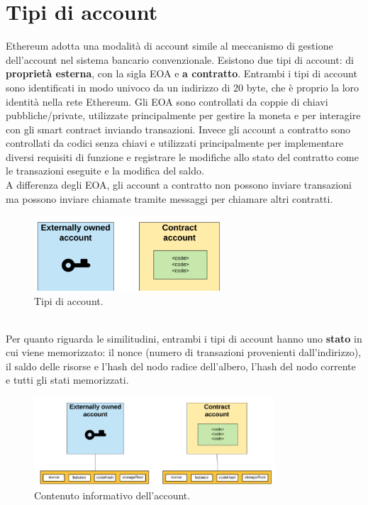 \documentclass[a4paper,11pt]{report}
\begin{document}
\section{Tipi di account}
Ethereum adotta una modalità di account simile al meccanismo di gestione dell'account nel sistema bancario convenzionale. Esistono due tipi di account: di \textbf{proprietà esterna}, con la sigla EOA e \textbf{a contratto}. Entrambi i tipi di account sono identificati in modo univoco da un indirizzo di 20 byte, che è proprio la loro identità nella rete Ethereum. Gli EOA sono controllati da coppie di chiavi pubbliche/private, utilizzate principalmente per gestire la moneta e per interagire con gli smart contract inviando transazioni. Invece gli account a contratto sono controllati da codici senza chiavi e utilizzati principalmente per implementare diversi requisiti di funzione e registrare le modifiche allo stato del contratto come le transazioni eseguite e la modifica del saldo.\\
A differenza degli EOA, gli account a contratto non possono inviare transazioni ma possono inviare chiamate tramite messaggi per chiamare altri contratti.\\
\begin{figure}[htbp] 
\begin{center}
\includegraphics[width=7cm]{img/ac.png} 
\end{center}
\caption{Tipi di account.}
\end{figure}
\\Per quanto riguarda le similitudini, entrambi i tipi di account hanno uno \textbf{stato} in cui viene memorizzato: il nonce (numero di transazioni provenienti dall'indirizzo), il saldo delle risorse e l'hash del nodo radice dell'albero, l'hash del nodo corrente e tutti gli stati memorizzati. \\
\begin{figure}[htbp] 
\begin{center}
\includegraphics[width=9cm]{img/ndi.png} 
\end{center}
\caption{Contenuto informativo dell'account.}
\end{figure}
\end{document}
